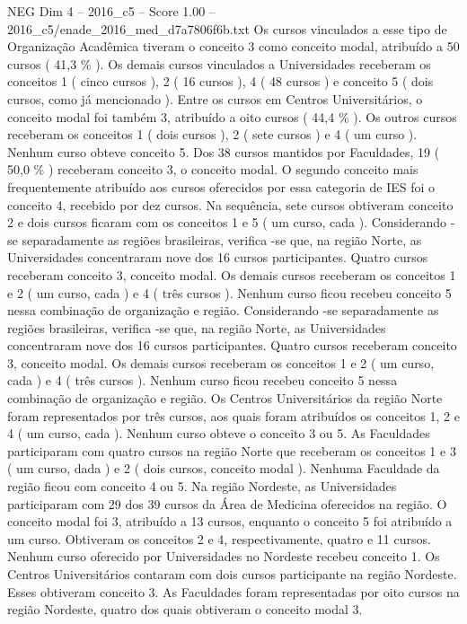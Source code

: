 \begin{textsample}{NEG Dim 4 – 2016\_c5 – Score 1.00 – 2016\_c5/enade\_2016\_med\_d7a7806f6b.txt}
Os cursos vinculados a esse tipo de Organização Acadêmica tiveram o conceito 3 como conceito modal, atribuído a 50 cursos ( 41,3 \% ).
Os demais cursos vinculados a Universidades receberam os conceitos 1 ( cinco cursos ), 2 ( 16 cursos ), 4 ( 48 cursos ) e conceito 5 ( dois cursos, como já mencionado ).
Entre os cursos em Centros Universitários, o conceito modal foi também 3, atribuído a oito cursos ( 44,4 \% ).
Os outros cursos receberam os conceitos 1 ( dois cursos ), 2 ( sete cursos ) e 4 ( um curso ).
Nenhum curso obteve conceito 5.
Dos 38 cursos mantidos por Faculdades, 19 ( 50,0 \% ) receberam conceito 3, o conceito modal.
O segundo conceito mais frequentemente atribuído aos cursos oferecidos por essa categoria de IES foi o conceito 4, recebido por dez cursos.
Na sequência, sete cursos obtiveram conceito 2 e dois cursos ficaram com os conceitos 1 e 5 ( um curso, cada ).
Considerando -se separadamente as regiões brasileiras, verifica -se que, na região Norte, as Universidades concentraram nove dos 16 cursos participantes.
Quatro cursos receberam conceito 3, conceito modal.
Os demais cursos receberam os conceitos 1 e 2 ( um curso, cada ) e 4 ( três cursos ).
Nenhum curso ficou recebeu conceito 5 nessa combinação de organização e região.
Considerando -se separadamente as regiões brasileiras, verifica -se que, na região Norte, as Universidades concentraram nove dos 16 cursos participantes.
Quatro cursos receberam conceito 3, conceito modal.
Os demais cursos receberam os conceitos 1 e 2 ( um curso, cada ) e 4 ( três cursos ).
Nenhum curso ficou recebeu conceito 5 nessa combinação de organização e região.
Os Centros Universitários da região Norte foram representados por três cursos, aos quais foram atribuídos os conceitos 1, 2 e 4 ( um curso, cada ).
Nenhum curso obteve o conceito 3 ou 5.
As Faculdades participaram com quatro cursos na região Norte que receberam os conceitos 1 e 3 ( um curso, dada ) e 2 ( dois cursos, conceito modal ).
Nenhuma Faculdade da região ficou com conceito 4 ou 5.
Na região Nordeste, as Universidades participaram com 29 dos 39 cursos da Área de Medicina oferecidos na região.
O conceito modal foi 3, atribuído a 13 cursos, enquanto o conceito 5 foi atribuído a um curso.
Obtiveram os conceitos 2 e 4, respectivamente, quatro e 11 cursos.
Nenhum curso oferecido por Universidades no Nordeste recebeu conceito 1.
Os Centros Universitários contaram com dois cursos participante na região Nordeste.
Esses obtiveram conceito 3.
As Faculdades foram representadas por oito cursos na região Nordeste, quatro dos quais obtiveram o conceito modal 3.

\end{textsample}
